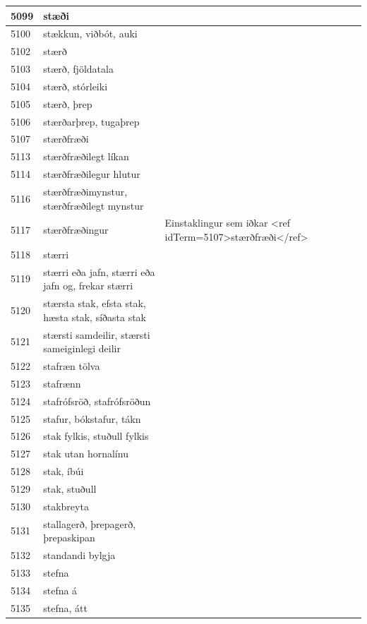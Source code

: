 \begin{longtable}{p{}|p{}|p{}|p{}|p{}}
\hline
5099 & stæði &  &  &  \\
\hline
5100 & stækkun, viðbót, auki &  &  &  \\
\hline
5102 & stærð &  &  &  \\
\hline
5103 & stærð, fjöldatala &  &  &  \\
\hline
5104 & stærð, stórleiki &  &  &  \\
\hline
5105 & stærð, þrep &  &  &  \\
\hline
5106 & stærðarþrep, tugaþrep &  &  &  \\
\hline
5107 & stærðfræði &  &  &  \\
\hline
5113 & stærðfræðilegt líkan &  &  &  \\
\hline
5114 & stærðfræðilegur hlutur &  &  &  \\
\hline
5116 & stærðfræðimynstur, stærðfræðilegt mynstur &  &  &  \\
\hline
5117 & stærðfræðingur & Einstaklingur sem iðkar <ref idTerm=5107>stærðfræði</ref> &  &  \\
\hline
5118 & stærri &  &  &  \\
\hline
5119 & stærri eða jafn, stærri eða jafn og, frekar stærri &  &  &  \\
\hline
5120 & stærsta stak, efsta stak, hæsta stak, síðasta stak &  &  &  \\
\hline
5121 & stærsti samdeilir, stærsti sameiginlegi deilir &  &  &  \\
\hline
5122 & stafræn tölva &  &  &  \\
\hline
5123 & stafrænn &  &  &  \\
\hline
5124 & stafrófsröð, stafrófsröðun &  &  &  \\
\hline
5125 & stafur, bókstafur, tákn &  &  &  \\
\hline
5126 & stak fylkis, stuðull fylkis &  &  &  \\
\hline
5127 & stak utan hornalínu &  &  &  \\
\hline
5128 & stak, íbúi &  &  &  \\
\hline
5129 & stak, stuðull &  &  &  \\
\hline
5130 & stakbreyta &  &  &  \\
\hline
5131 & stallagerð, þrepagerð, þrepaskipan &  &  &  \\
\hline
5132 & standandi bylgja &  &  &  \\
\hline
5133 & stefna &  &  &  \\
\hline
5134 & stefna á &  &  &  \\
\hline
5135 & stefna, átt &  &  &  \\

\end{longtable}

